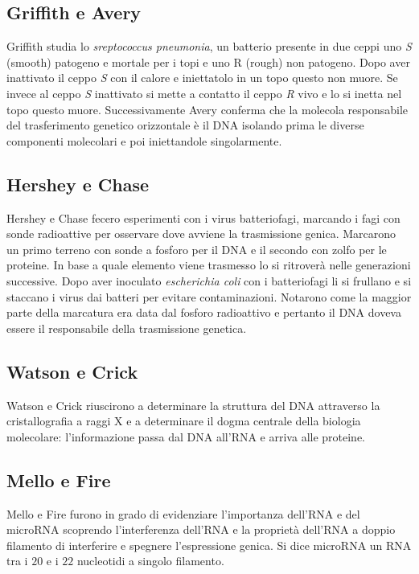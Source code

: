 \subsection{Griffith e Avery}
Griffith studia lo \emph{sreptococcus pneumonia}, un batterio presente in due ceppi uno \emph{S} (smooth) patogeno e mortale per i topi e uno R (rough) non patogeno. Dopo aver 
inattivato il ceppo \emph{S} con il calore e iniettatolo in un topo questo non muore. Se invece al ceppo \emph{S} inattivato si mette a contatto il ceppo \emph{R} vivo e lo si inetta nel
topo questo muore. Successivamente Avery conferma che la molecola responsabile del trasferimento genetico orizzontale \`e il DNA isolando prima le diverse componenti molecolari e poi 
iniettandole singolarmente. 
\subsection{Hershey e Chase}
Hershey e Chase fecero esperimenti con i virus batteriofagi, marcando i fagi con sonde radioattive per osservare dove avviene la trasmissione genica. Marcarono un primo terreno con 
sonde a fosforo \textbf{} per il DNA e il secondo con zolfo \textbf{} per le proteine. In base a quale elemento viene trasmesso lo si ritrover\`a nelle generazioni 
successive. Dopo aver inoculato \emph{escherichia coli} con i batteriofagi li si frullano e si staccano i virus dai batteri per evitare contaminazioni. Notarono come la maggior parte 
della marcatura era data dal fosforo radioattivo e pertanto il DNA doveva essere il responsabile della trasmissione genetica. 
\subsection{Watson e Crick}
Watson e Crick riuscirono a determinare la struttura del DNA attraverso la cristallografia a raggi X e a determinare il dogma centrale della biologia molecolare: l'informazione passa 
dal DNA all'RNA e arriva alle proteine. 
\subsection{Mello e Fire}
Mello e Fire furono in grado di evidenziare l'importanza dell'RNA e del microRNA scoprendo l'interferenza dell'RNA e la propriet\`a dell'RNA a doppio filamento di interferire e spegnere
l'espressione genica. Si dice microRNA un RNA tra i $20$ e i $22$ nucleotidi a singolo filamento. 

